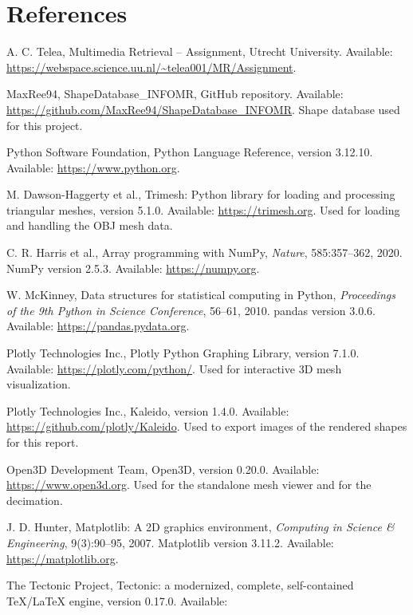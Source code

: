 \documentclass[10pt,a4paper]{article}
\begin{document}
\section*{References}
\begin{description}[leftmargin=2.2em,labelwidth=2em,style=sameline]\sloppy
\item[{[1]}] A. C. Telea, Multimedia Retrieval -- Assignment, Utrecht University. Available:
  \url{https://webspace.science.uu.nl/~telea001/MR/Assignment}.
\item[{[2]}] MaxRee94, ShapeDatabase\_INFOMR, GitHub repository. Available: \url{https://github.com/MaxRee94/ShapeDatabase_INFOMR}.
  Shape database used for this project.
\item[{[3]}] Python Software Foundation, Python Language Reference, version 3.12.10. Available: \url{https://www.python.org}.
\item[{[4]}] M. Dawson-Haggerty et al., Trimesh: Python library for loading and processing triangular meshes, version 5.1.0.
  Available: \url{https://trimesh.org}. Used for loading and handling the OBJ mesh data.
\item[{[5]}] C. R. Harris et al., Array programming with NumPy, \emph{Nature}, 585:357--362, 2020. NumPy version 2.5.3. Available:
  \url{https://numpy.org}.
\item[{[6]}] W. McKinney, Data structures for statistical computing in Python, \emph{Proceedings of the 9th Python in Science
  Conference}, 56--61, 2010. pandas version 3.0.6. Available: \url{https://pandas.pydata.org}.
\item[{[7]}] Plotly Technologies Inc., Plotly Python Graphing Library, version 7.1.0. Available: \url{https://plotly.com/python/}.
  Used for interactive 3D mesh visualization.
\item[{[8]}] Plotly Technologies Inc., Kaleido, version 1.4.0. Available: \url{https://github.com/plotly/Kaleido}. Used to export
  images of the rendered shapes for this report.
\item[{[9]}] Open3D Development Team, Open3D, version 0.20.0. Available: \url{https://www.open3d.org}. Used for the standalone
  mesh viewer and for the decimation.
\item[{[10]}] J. D. Hunter, Matplotlib: A 2D graphics environment, \emph{Computing in Science \& Engineering}, 9(3):90--95,
  2007. Matplotlib version 3.11.2. Available: \url{https://matplotlib.org}.
\item[{[11]}] The Tectonic Project, Tectonic: a modernized, complete, self-contained TeX/LaTeX engine, version 0.17.0. Available:

\end{description}
\end{document}
